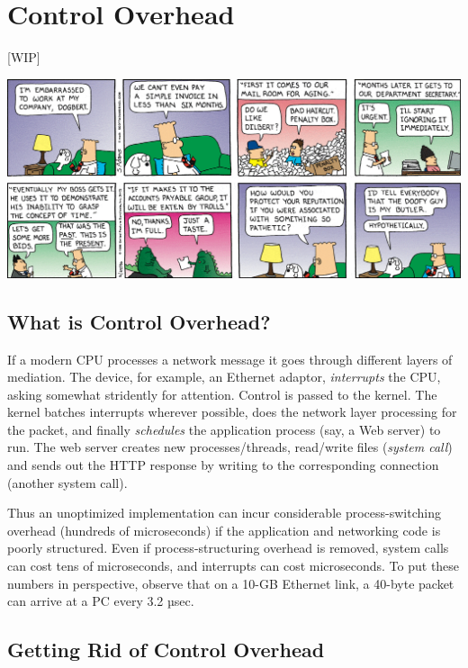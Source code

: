 \chapter{Control Overhead} \label{CHAP:CTLOVERHEAD}

[WIP]

\includegraphics[width=\textwidth]{images/chap6/dilbert.png}

\section{What is Control Overhead?}

If a modern CPU processes a network message it goes through different layers of mediation.  The device, for example, an Ethernet adaptor, \textit{interrupts} the CPU, asking somewhat
stridently for attention. Control is passed to the kernel. The kernel batches interrupts wherever possible, does the network layer processing for the packet, and finally \textit{schedules} the application process (say, a Web server) to run. The web server creates new processes/threads, read/write files (\textit{system call}) and sends out the HTTP response by writing to the corresponding connection (another system call).

Thus an unoptimized implementation can incur considerable process-switching overhead
(hundreds of microseconds) if the application and networking code is poorly structured. Even
if process-structuring overhead is removed, system calls can cost tens of microseconds, and
interrupts can cost microseconds. To put these numbers in perspective, observe that on a 10-GB Ethernet link, a 40-byte packet can arrive at a PC every 3.2 µsec.





\section{Getting Rid of Control Overhead}

